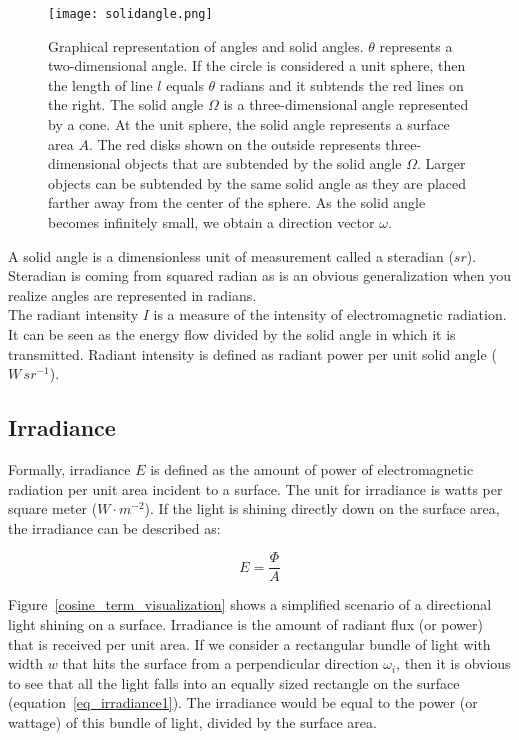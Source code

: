 \documentclass[11pt,a4paper]{report}
\begin{document}
\begin{figure}
\begin{center}
\texttt{[image: solidangle.png]}
\end{center}
\caption{Graphical representation of angles and solid angles. $\theta$ represents a two-dimensional angle. If the circle is considered a unit sphere, then the length of line $l$ equals $\theta$ radians and it subtends the red lines on the right. The solid angle $\Omega$ is a three-dimensional angle represented by a cone. At the unit sphere, the solid angle represents a surface area $A$. The red disks shown on the outside represents three-dimensional objects that are subtended by the solid angle $\Omega$. Larger objects can be subtended by the same solid angle as they are placed farther away from the center of the sphere. As the solid angle becomes infinitely small, we obtain a direction vector $\omega$.}
\label{fig_solidangle}
\end{figure}

A solid angle is a dimensionless unit of measurement called a steradian ($sr$). Steradian is coming from squared radian as is an obvious generalization when you realize angles are represented in radians.\\

The radiant intensity $I$ is a measure of the intensity of electromagnetic radiation. It can be seen as the energy flow divided by the solid angle in which it is transmitted. Radiant intensity is defined as radiant power per unit solid angle ($W \, sr^{-1}$).

\subsection{Irradiance}
\label{radiance_irradiance}

Formally, irradiance $E$ is defined as the amount of power of electromagnetic radiation per unit area incident to a surface. The unit for irradiance is watts per square meter ($W \cdot m^{-2}$). If the light is shining directly down on the surface area, the irradiance can be described as:

\begin{equation}
E = \frac{\Phi}{A}
\label{eq_irradiance1}
\end{equation} 

Figure~\ref{cosine_term_visualization} shows a simplified scenario of a directional light shining on a surface. Irradiance is the amount of radiant flux (or power) that is received per unit area. If we consider a rectangular bundle of light with width $w$ that hits the surface from a perpendicular direction $\omega_i$, then it is obvious to see that all the light falls into an equally sized rectangle on the surface (equation~\ref{eq_irradiance1}). The irradiance would be equal to the power (or wattage) of this bundle of light, divided by the surface area.
\end{document}
